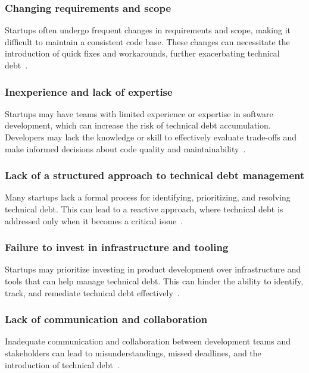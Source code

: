 \subsubsection{Changing requirements and scope}
Startups often undergo frequent changes in requirements and scope, making it difficult to maintain a consistent code base. These changes can necessitate the introduction of quick fixes and workarounds, further exacerbating technical debt~\cite{DesignSt86:online,Creating18:online}.

\subsubsection{Inexperience and lack of expertise} 
Startups may have teams with limited experience or expertise in software development, which can increase the risk of technical debt accumulation. Developers may lack the knowledge or skill to effectively evaluate trade-offs and make informed decisions about code quality and maintainability~\cite{Blog21:online}. 

\subsubsection{Lack of a structured approach to technical debt management} 
Many startups lack a formal process for identifying, prioritizing, and resolving technical debt. This can lead to a reactive approach, where technical debt is addressed only when it becomes a critical issue~\cite{FowlerBottlenecks}.

\subsubsection{Failure to invest in infrastructure and tooling} 
Startups may prioritize investing in product development over infrastructure and tools that can help manage technical debt. This can hinder the ability to identify, track, and remediate technical debt effectively~\cite{Blog21:online,Totalqua26:online}.

\subsubsection{Lack of communication and collaboration}
Inadequate communication and collaboration between development teams and stakeholders can lead to misunderstandings, missed deadlines, and the introduction of technical debt~\cite{Whopayso60:online,TheTop5S17:online}.

